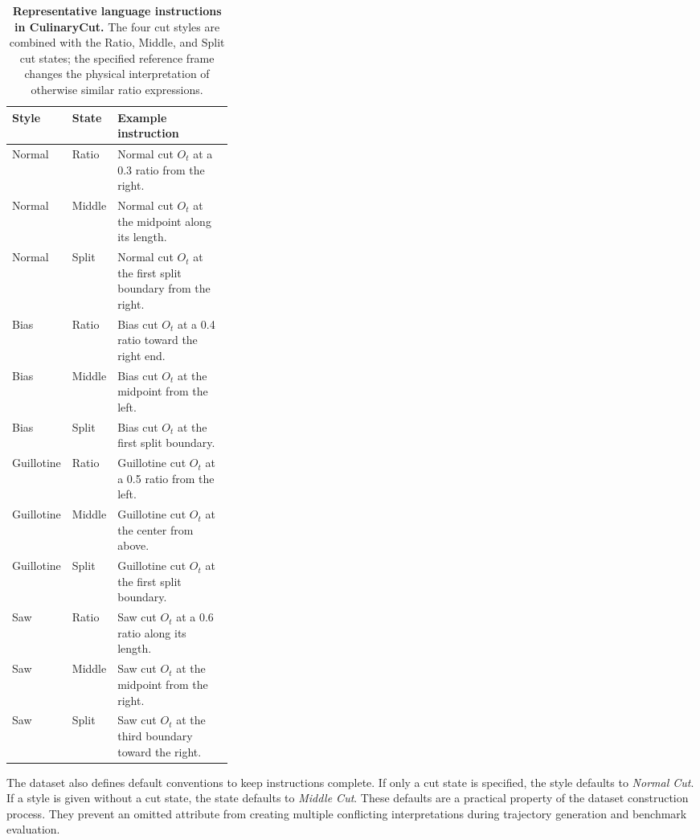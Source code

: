 \begin{table}[!htbp]
  \centering

  \caption[{Representative language instructions in CulinaryCut}]{\textbf{Representative language instructions in CulinaryCut.} The four cut styles are combined with the Ratio, Middle, and Split cut states; the specified reference frame changes the physical interpretation of otherwise similar ratio expressions.}
  \label{tab:cut_language_examples}
    \begingroup
  \CutTableSetup
  \begin{tabularx}{\linewidth}{@{}>{\raggedright\arraybackslash}p{0.17\linewidth}>{\raggedright\arraybackslash}p{0.15\linewidth}X@{}}
    \toprule
    Style & State & Example instruction \\
    \midrule
    Normal & Ratio & Normal cut $O_t$ at a 0.3 ratio from the right. \\
    Normal & Middle & Normal cut $O_t$ at the midpoint along its length. \\
    Normal & Split & Normal cut $O_t$ at the first split boundary from the right. \\
    \midrule
    Bias & Ratio & Bias cut $O_t$ at a 0.4 ratio toward the right end. \\
    Bias & Middle & Bias cut $O_t$ at the midpoint from the left. \\
    Bias & Split & Bias cut $O_t$ at the first split boundary. \\
    \midrule
    Guillotine & Ratio & Guillotine cut $O_t$ at a 0.5 ratio from the left. \\
    Guillotine & Middle & Guillotine cut $O_t$ at the center from above. \\
    Guillotine & Split & Guillotine cut $O_t$ at the first split boundary. \\
    \midrule
    Saw & Ratio & Saw cut $O_t$ at a 0.6 ratio along its length. \\
    Saw & Middle & Saw cut $O_t$ at the midpoint from the right. \\
    Saw & Split & Saw cut $O_t$ at the third boundary toward the right. \\
    \bottomrule
  \end{tabularx}
  \endgroup
\end{table}

The dataset also defines default conventions to keep instructions complete. If only a cut state is specified, the style defaults to \emph{Normal Cut}. If a style is given without a cut state, the state defaults to \emph{Middle Cut}. These defaults are a practical property of the dataset construction process. They prevent an omitted attribute from creating multiple conflicting interpretations during trajectory generation and benchmark evaluation.

